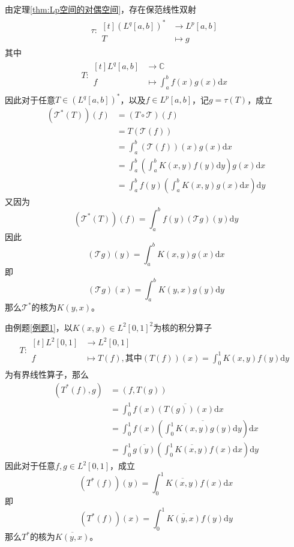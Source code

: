 \documentclass[lang = cn, scheme = chinese, thmcnt = section]{elegantbook}
\newcommand{\C}{\mathbb{C}}  		   %
\begin{document}
\begin{example}
	由定理\ref{thm:Lp空间的对偶空间}，存在保范线性双射
	\begin{align*}
		\tau:\begin{aligned}[t]
			(L^q[a,b])^*&\longrightarrow L^p[a,b]\\
			T&\longmapsto g
		\end{aligned}
	\end{align*}
	其中
	\begin{align*}
		T:\begin{aligned}[t]
			L^q[a,b]&\longrightarrow \C\\
			f&\longmapsto \int_a^b f(x)g(x)\mathrm{d}x
		\end{aligned}
	\end{align*}
	因此对于任意$T\in (L^q[a,b])^*$，以及$f\in L^p[a,b]$，记$g=\tau(T)$，成立
	\begin{align*}
		(\mathscr{T}^*(T))(f)
		& = (T\circ \mathscr{T})(f)\\
		& = T(\mathscr{T}(f))\\
		& = \int_a^b (\mathscr{T}(f))(x)g(x)\mathrm{d}x\\
		& = \int_a^b \left(\int_a^bK(x,y)f(y)\mathrm{d}y\right)g(x)\mathrm{d}x\\
		& = \int_a^b f(y) \left(\int_a^bK(x,y)g(x)\mathrm{d}x\right)\mathrm{d}y
	\end{align*}
	又因为
	$$
	(\mathscr{T}^*(T))(f)=\int_a^b f(y)(\mathscr{T}g)(y)\mathrm{d}y
	$$
	因此
	$$
	(\mathscr{T}g)(y)=\int_a^bK(x,y)g(x)\mathrm{d}x
	$$
	即
	$$
	(\mathscr{T}g)(x)=\int_a^bK(y,x)g(y)\mathrm{d}y
	$$
	那么$\mathscr{T}^*$的核为$K(y,x)$。
\end{example}

\begin{example}
	由例题\ref{例题1}，以$K(x,y)\in L^2[0,1]^2$为核的积分算子
	\begin{align*}
		T:\begin{aligned}[t]
			L^2[0,1]&\longrightarrow L^2[0,1]\\
			f&\longmapsto T(f),\text{其中}(T(f))(x)=\int_0^1K(x,y)f(y)\mathrm{d}y
		\end{aligned}
	\end{align*}
	为有界线性算子，那么
	\begin{align*}
		(T^*(f),g)
		& = (f,T(g))\\
		& = \int_0^1f(x)\overline{(T(g))(x)}\mathrm{d}x\\
		& = \int_0^1f(x)\left(\overline{\int_0^1K(x,y)g(y)\mathrm{d}y}\right)\mathrm{d}x\\
		& = \int_0^1\overline{g(y)}\left(\int_0^1\overline{K(x,y)}f(x)\mathrm{d}x\right)\mathrm{d}y
	\end{align*}
	因此对于任意$f,g\in L^2[0,1]$，成立
	$$
	(T^*(f))(y)=\int_0^1\overline{K(x,y)}f(x)\mathrm{d}x
	$$
	即
	$$
	(T^*(f))(x)=\int_0^1\overline{K(y,x)}f(y)\mathrm{d}y
	$$
	那么$T^*$的核为$\overline{K(y,x)}$。
\end{example}
\end{document}
